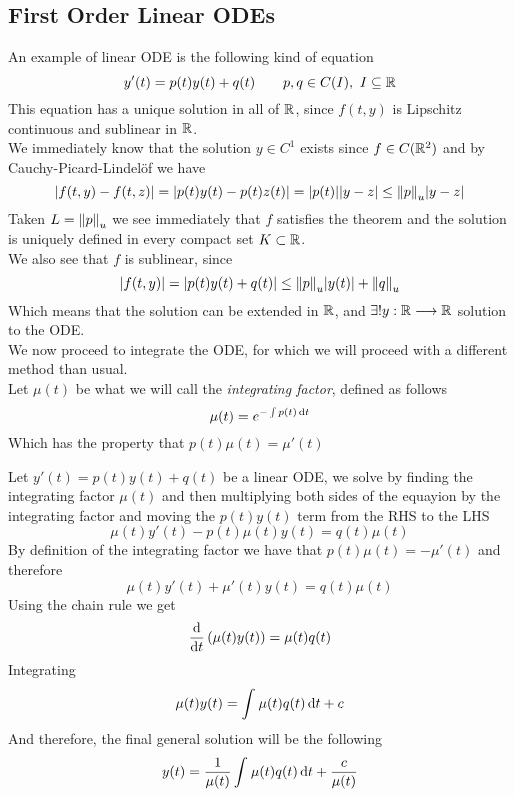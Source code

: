 \documentclass[../complete.tex]{subfiles}
\begin{document}
\subsection{First Order Linear ODEs}
\begin{dfn}
	An example of linear ODE is the following kind of equation
	\begin{equation}
		y'(t)=p(t)y(t)+q(t)\qquad p,q\in C(I),\ I\subseteq\R
		\label{eq:integratingfactor}
	\end{equation}
	This equation has a unique solution in all of $\mathbb{R}$, since $f(t,y)$ is Lipschitz continuous and sublinear in $\mathbb{R}$.\\
	We immediately know that the solution $y\in C^1$ exists since $f\in C(\mathbb{R}^2)$ and by Cauchy-Picard-Lindelöf we have
	\begin{equation*}
		\abs{f(t,y)-f(t,z)}=\abs{p(t)y(t)-p(t)z(t)}=\abs{p(t)}\abs{y-z}\le\norm{p}_u\abs{y-z}
	\end{equation*}
	Taken $L=\norm{p}_u$ we see immediately that $f$ satisfies the theorem and the solution is uniquely defined in every compact set $K\subset\mathbb{R}$.\\
	We also see that $f$ is sublinear, since
	\begin{equation*}
		\abs{f(t,y)}=\abs{p(t)y(t)+q(t)}\le\norm{p}_u\abs{y(t)}+\norm{q}_u
	\end{equation*}
	Which means that the solution can be extended in $\mathbb{R}$, and $\exists!y:\mathbb{R}\overset{}{\longrightarrow}\mathbb{R}$ solution to the ODE.\\
	We now proceed to integrate the ODE, for which we will proceed with a different method than usual.\\
	Let $\mu(t)$ be what we will call the \textit{integrating factor}, defined as follows
	\begin{equation*}
		\mu(t)=e^{-\int p(t)\operatorname{d\!} t}
	\end{equation*}
	Which has the property that $p(t)\mu(t)=\mu'(t)$
\end{dfn}
\begin{mtd}
	Let $y'(t)=p(t)y(t)+q(t)$ be a linear ODE, we solve by finding the integrating factor $\mu(t)$ and then multiplying both sides of the equayion by the integrating factor and moving the $p(t)y(t)$ term from the RHS to the LHS
	\begin{equation*}
		\mu(t)y'(t)-p(t)\mu(t)y(t)=q(t)\mu(t)
	\end{equation*}
	By definition of the integrating factor we have that $p(t)\mu(t)=-\mu'(t)$ and therefore
	\begin{equation*}
		\mu(t)y'(t)+\mu'(t)y(t)=q(t)\mu(t)
	\end{equation*}
	Using the chain rule we get
	\begin{equation*}
		\derivative{t}\left( \mu(t)y(t) \right)=\mu(t)q(t)
	\end{equation*}
	Integrating
	\begin{equation*}
		\mu(t)y(t)=\int_{}^{}\mu(t)q(t)\operatorname{d\!} t+c
	\end{equation*}
	And therefore, the final general solution will be the following
	\begin{equation*}
		y(t)=\frac{1}{\mu(t)}\int_{}^{}\mu(t)q(t)\operatorname{d\!} t+\frac{c}{\mu(t)}
	\end{equation*}
\end{mtd}
\end{document}
